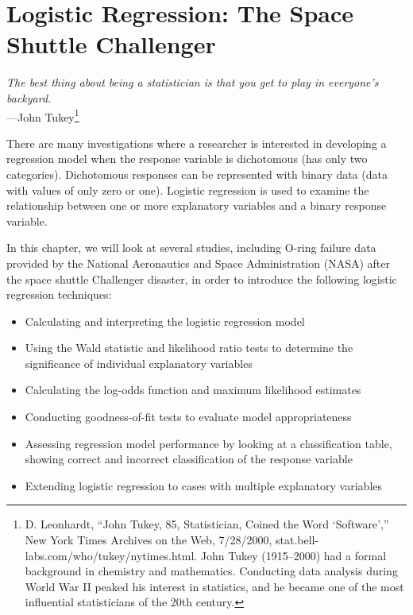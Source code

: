 \documentclass[
]{report}
\providecommand{\tightlist}{%
  \setlength{\itemsep}{0pt}\setlength{\parskip}{0pt}}
\begin{document}
\hypertarget{logistic-regression-the-space-shuttle-challenger-1}{%
\chapter{Logistic Regression: The Space Shuttle Challenger}\label{logistic-regression-the-space-shuttle-challenger-1}}

{ \emph{The best thing about being a statistician is that you get to play in everyone's backyard.}}\\
{ ---John Tukey\footnote{D. Leonhardt, ``John Tukey, 85, Statistician, Coined the Word `Software','' New York Times Archives on the Web, 7/28/2000, stat.bell-labs.com/who/tukey/nytimes.html. John Tukey (1915--2000) had a formal background in chemistry and mathematics. Conducting data analysis during World War II peaked his interest in statistics, and he became one of the most influential statisticians of the 20th century.}}

There are many investigations where a researcher is interested in developing a regression model when the response variable is dichotomous (has only two categories). Dichotomous responses can be represented with binary data (data with values of only zero or one). Logistic regression is used to examine the relationship between one or more explanatory variables and a binary response variable.

In this chapter, we will look at several studies, including O-ring failure data provided by the National Aeronautics and Space Administration (NASA) after the space shuttle Challenger disaster, in order to introduce the following logistic regression techniques:

\begin{itemize}
\tightlist
\item
  Calculating and interpreting the logistic regression model\\
\item
  Using the Wald statistic and likelihood ratio tests to determine the significance of individual explanatory variables\\
\item
  Calculating the log-odds function and maximum likelihood estimates\\
\item
  Conducting goodness-of-fit tests to evaluate model appropriateness\\
\item
  Assessing regression model performance by looking at a classification table, showing correct and incorrect classification of the response variable\\
\item
  Extending logistic regression to cases with multiple explanatory variables
\end{itemize}
\end{document}

